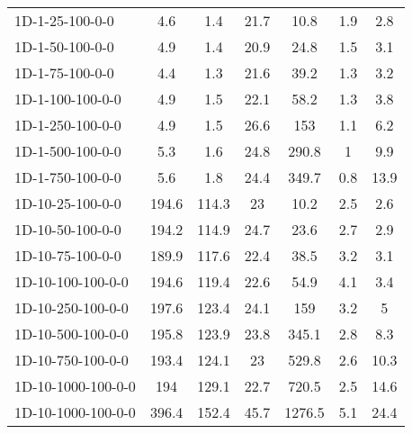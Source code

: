 \documentclass{article}
\begin{document}
\begin{table}[h]
\begin{center}
\begin{tabular}{|l||c|c|c|c|c|c|}
            \hline
            1D-1-25-100-0-0                       & 4.6     & 1.4        & 21.7       & 10.8        & 1.9       & 2.8        \\
            1D-1-50-100-0-0                       & 4.9     & 1.4        & 20.9       & 24.8        & 1.5       & 3.1        \\
            1D-1-75-100-0-0                       & 4.4     & 1.3        & 21.6       & 39.2        & 1.3       & 3.2        \\
            1D-1-100-100-0-0                      & 4.9     & 1.5        & 22.1       & 58.2        & 1.3       & 3.8        \\
            1D-1-250-100-0-0                      & 4.9     & 1.5        & 26.6       & 153         & 1.1       & 6.2        \\
            1D-1-500-100-0-0                      & 5.3     & 1.6        & 24.8       & 290.8       & 1         & 9.9        \\
            1D-1-750-100-0-0                      & 5.6     & 1.8        & 24.4       & 349.7       & 0.8       & 13.9       \\
            \hline
            1D-10-25-100-0-0                       & 194.6   & 114.3      & 23         & 10.2        & 2.5       & 2.6        \\
            1D-10-50-100-0-0                       & 194.2   & 114.9      & 24.7       & 23.6        & 2.7       & 2.9        \\
            1D-10-75-100-0-0                       & 189.9   & 117.6      & 22.4       & 38.5        & 3.2       & 3.1        \\
            1D-10-100-100-0-0                      & 194.6   & 119.4      & 22.6       & 54.9        & 4.1       & 3.4        \\
            1D-10-250-100-0-0                      & 197.6   & 123.4      & 24.1       & 159         & 3.2       & 5          \\
            1D-10-500-100-0-0                      & 195.8   & 123.9      & 23.8       & 345.1       & 2.8       & 8.3        \\
            1D-10-750-100-0-0                      & 193.4   & 124.1      & 23         & 529.8       & 2.6       & 10.3       \\
            1D-10-1000-100-0-0                     & 194     & 129.1      & 22.7       & 720.5       & 2.5       & 14.6       \\
            1D-10-1000-100-0-0                     & 396.4   & 152.4      & 45.7       & 1276.5      & 5.1       & 24.4       \\

\end{tabular}
\end{center}
\end{table}
\end{document}
